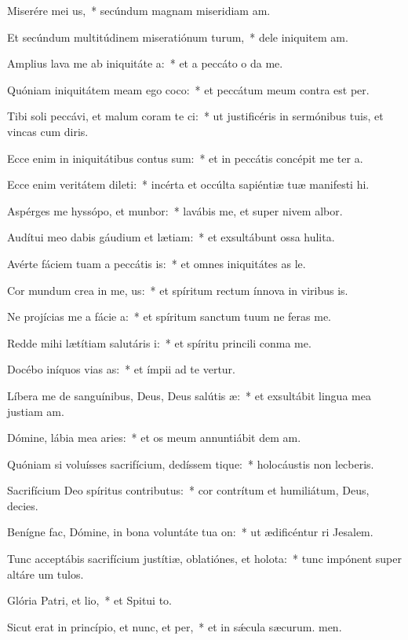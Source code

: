 \item Miserére mei us,~* secúndum magnam miseridiam am.
\item Et secúndum multitúdinem miseratiónum turum,~* dele iniquitem am.
\item Amplius lava me ab iniquitáte a:~* et a peccáto o da me.
\item Quóniam iniquitátem meam ego coco:~* et peccátum meum contra  est per.
\item Tibi soli peccávi, et malum coram te ci:~* ut justificéris in sermónibus tuis, et vincas cum diris.
\item Ecce enim in iniquitátibus contus sum:~* et in peccátis concépit me ter a.
\item Ecce enim veritátem dileti:~* incérta et occúlta sapiéntiæ tuæ manifesti hi.
\item Aspérges me hyssópo, et munbor:~* lavábis me, et super nivem albor.
\item Audítui meo dabis gáudium et lætiam:~* et exsultábunt ossa hulita.
\item Avérte fáciem tuam a peccátis is:~* et omnes iniquitátes as le.
\item Cor mundum crea in me, us:~* et spíritum rectum ínnova in viribus is.
\item Ne projícias me a fácie a:~* et spíritum sanctum tuum ne feras  me.
\item Redde mihi lætítiam salutáris i:~* et spíritu princili conma me.
\item Docébo iníquos vias as:~* et ímpii ad te vertur.
\item Líbera me de sanguínibus, Deus, Deus salútis æ:~* et exsultábit lingua mea justiam am.
\item Dómine, lábia mea aries:~* et os meum annuntiábit dem am.
\item Quóniam si voluísses sacrifícium, dedíssem tique:~* holocáustis non lecberis.
\item Sacrifícium Deo spíritus contributus:~* cor contrítum et humiliátum, Deus,  decies.
\item Benígne fac, Dómine, in bona voluntáte tua on:~* ut ædificéntur ri Jesalem.
\item Tunc acceptábis sacrifícium justítiæ, oblatiónes, et holota:~* tunc impónent super altáre um tulos.
\item Glória Patri, et lio,~* et Spitui to.
\item Sicut erat in princípio, et nunc, et per,~* et in sǽcula sæcurum. men.
